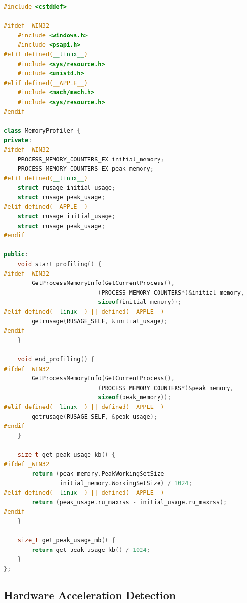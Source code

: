 \documentclass[12pt,a4paper]{article}
\begin{document}
\begin{lstlisting}[language=C++, caption=Cross-Platform Memory Profiler Code]
#include <cstddef>

#ifdef _WIN32
    #include <windows.h>
    #include <psapi.h>
#elif defined(__linux__)
    #include <sys/resource.h>
    #include <unistd.h>
#elif defined(__APPLE__)
    #include <mach/mach.h>
    #include <sys/resource.h>
#endif

class MemoryProfiler {
private:
#ifdef _WIN32
    PROCESS_MEMORY_COUNTERS_EX initial_memory;
    PROCESS_MEMORY_COUNTERS_EX peak_memory;
#elif defined(__linux__)
    struct rusage initial_usage;
    struct rusage peak_usage;
#elif defined(__APPLE__)
    struct rusage initial_usage;
    struct rusage peak_usage;
#endif
    
public:
    void start_profiling() {
#ifdef _WIN32
        GetProcessMemoryInfo(GetCurrentProcess(), 
                           (PROCESS_MEMORY_COUNTERS*)&initial_memory, 
                           sizeof(initial_memory));
#elif defined(__linux__) || defined(__APPLE__)
        getrusage(RUSAGE_SELF, &initial_usage);
#endif
    }
    
    void end_profiling() {
#ifdef _WIN32
        GetProcessMemoryInfo(GetCurrentProcess(), 
                           (PROCESS_MEMORY_COUNTERS*)&peak_memory, 
                           sizeof(peak_memory));
#elif defined(__linux__) || defined(__APPLE__)
        getrusage(RUSAGE_SELF, &peak_usage);
#endif
    }
    
    size_t get_peak_usage_kb() {
#ifdef _WIN32
        return (peak_memory.PeakWorkingSetSize - 
                initial_memory.WorkingSetSize) / 1024;
#elif defined(__linux__) || defined(__APPLE__)
        return (peak_usage.ru_maxrss - initial_usage.ru_maxrss);
#endif
    }
    
    size_t get_peak_usage_mb() {
        return get_peak_usage_kb() / 1024;
    }
};
\end{lstlisting}

\subsection{Hardware Acceleration Detection}
\end{document}
